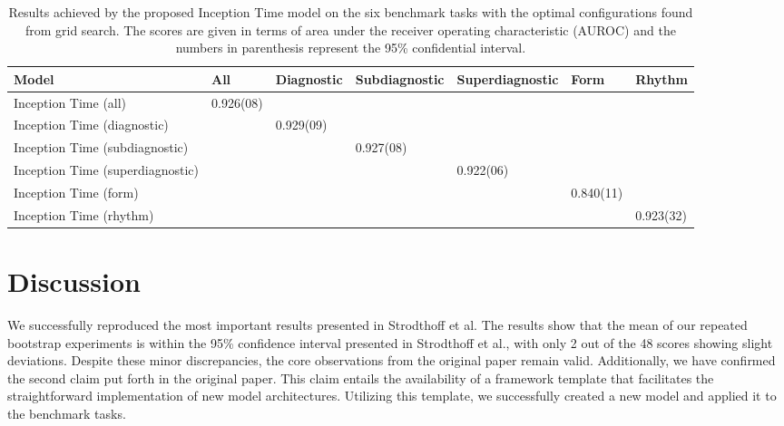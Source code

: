 \begin{table}[hp]
\scriptsize
\caption{Results achieved by the proposed Inception Time model on the six benchmark tasks with the optimal configurations found from grid search. The scores are given in terms of area under the receiver operating characteristic (AUROC) and the numbers in parenthesis represent the 95\% confidential interval. }
\begin{tabular}{lllllll}
\cellcolor[HTML]{C0C0C0}\textbf{Model} & \cellcolor[HTML]{C0C0C0}\textbf{All} & \cellcolor[HTML]{C0C0C0}\textbf{Diagnostic} & \cellcolor[HTML]{C0C0C0}\textbf{Subdiagnostic} & \cellcolor[HTML]{C0C0C0}\textbf{Superdiagnostic} & \cellcolor[HTML]{C0C0C0}\textbf{Form} & \cellcolor[HTML]{C0C0C0}\textbf{Rhythm} \\\hline
Inception Time (all)              & 0.926(08) &  &  &  &  &  \\
Inception Time (diagnostic)       &  & 0.929(09) &  &  &  &  \\
Inception Time (subdiagnostic)    &  &  & 0.927(08) & & &  \\
Inception Time (superdiagnostic)  &  &  &  & 0.922(06) & &  \\
Inception Time (form)             &  &  &  &  & 0.840(11) &  \\
Inception Time (rhythm)           &  &  &  &  &  & 0.923(32) \\\hline                           
\end{tabular}
\label{tab:InceptionTime_score}
\end{table}




\section{Discussion}
We successfully reproduced the most important results presented in Strodthoff et al. The results show that the mean of our repeated bootstrap experiments is within the 95\% confidence interval presented in Strodthoff et al., with only 2 out of the 48 scores showing slight deviations. Despite these minor discrepancies, the core observations from the original paper remain valid. Additionally, we have confirmed the second claim put forth in the original paper. This claim entails the availability of a framework template that facilitates the straightforward implementation of new model architectures. Utilizing this template, we successfully created a new model and applied it to the benchmark tasks.

